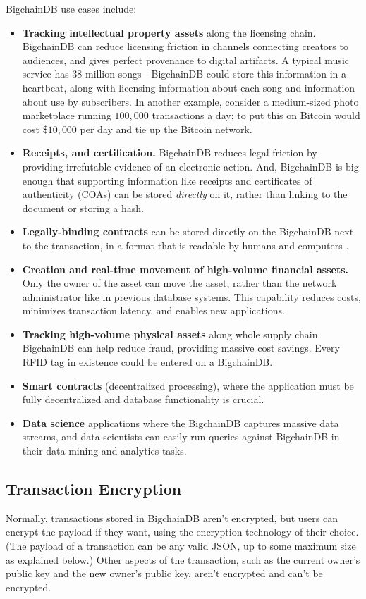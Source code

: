 BigchainDB use cases include:
\begin{itemize}
 \item \textbf{Tracking intellectual property assets} along the licensing chain. BigchainDB can reduce licensing friction in channels connecting creators to audiences, and gives perfect provenance to digital artifacts. A typical music service has $38$ million songs—BigchainDB could store this information in a heartbeat, along with licensing information about each song and information about use by subscribers. In another example, consider a medium-sized photo marketplace running $100,000$ transactions a day; to put this on Bitcoin would cost \$$10,000$ per day and tie up the Bitcoin network.
 \item \textbf{Receipts, and certification.} BigchainDB reduces legal friction by providing irrefutable evidence of an electronic action. And, BigchainDB is big enough that supporting information like receipts and certificates of authenticity (COAs) can be stored \textit{directly} on it, rather than linking to the document or storing a hash.
 \item \textbf{Legally-binding contracts} can be stored directly on the BigchainDB next to the transaction, in a format that is readable by humans and computers \cite{grigg2004ricardian}.
 \item \textbf{Creation and real-time movement of high-volume financial assets.} Only the owner of the asset can move the asset, rather than the network administrator like in previous database systems. This capability reduces costs, minimizes transaction latency, and enables new applications.
 \item \textbf{Tracking high-volume physical assets} along whole supply chain. BigchainDB can help reduce fraud, providing massive cost savings. Every RFID tag in existence could be entered on a BigchainDB.
 \item \textbf{Smart contracts} (decentralized processing), where the application must be fully decentralized and database functionality is crucial.
 \item \textbf{Data science} applications where the BigchainDB captures massive data streams, and data scientists can easily run queries against BigchainDB in their data mining and analytics tasks.
\end{itemize}

\subsection{Transaction Encryption}
Normally, transactions stored in BigchainDB aren't encrypted, but users can encrypt the payload if they want, using the encryption technology of their choice. (The payload of a transaction can be any valid JSON, up to some maximum size as explained below.) Other aspects of the transaction, such as the current owner's public key and the new owner's public key, aren't encrypted and can't be encrypted.


